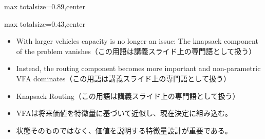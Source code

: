 \begin{minipage}[t]{0.58\textwidth}
\begin{adjustbox}{max totalsize={\textwidth}{0.89\textheight},center}
\begin{minipage}{\textwidth}
\end{minipage}
\end{adjustbox}
\end{minipage}


\clearpage
{}
\begin{minipage}[t]{0.405\textwidth}
\begin{adjustbox}{max totalsize={\textwidth}{0.43\textheight},center}
\begin{minipage}{\textwidth}\scriptsize
{}\begin{itemize}
\item With larger vehicles capacity is no longer an issue: The knapsack component of the problem vanishes（この用語は講義スライド上の専門語として扱う）
\item Instead, the routing component becomes more important and non-parametric VFA dominates（この用語は講義スライド上の専門語として扱う）
\item Knapsack Routing（この用語は講義スライド上の専門語として扱う）
\end{itemize}\begin{itemize}
\item VFAは将来価値を特徴量に基づいて近似し、現在決定に組み込む。
\item 状態そのものではなく、価値を説明する特徴量設計が重要である。
\end{itemize}
\end{minipage}
\end{adjustbox}
\end{minipage}\hfill
